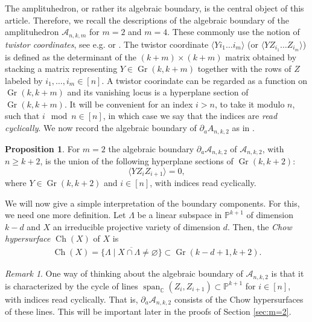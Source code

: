 \documentclass[12pt]{extarticle}
\theoremstyle{definition}
\theoremstyle{theorem}
\newtheorem{proposition}[definition]{Proposition}
\theoremstyle{remark}
\newtheorem{remark}[definition]{Remark}
\numberwithin{equation}{section}
\newcommand{\C}{\mathbb{C}}
\newcommand{\PP}{\mathbb{P}}
\DeclareMathOperator{\gr}{Gr}
\newcommand{\aA}{\mathcal{A}}
\newcommand{\CH}{\operatorname{Ch}}
\begin{document}
The amplituhedron, or rather its algebraic boundary, is the central object of this article.
Therefore, we recall the descriptions of the algebraic boundary of the amplituhedron $\aA_{n,k,m}$ for $m=2$ and $m=4$.
These commonly use the notion of \emph{twistor coordinates}, see e.g. \cite{hodges2013eliminating} or \cite[Definition 4.5]{williams2023positive}. The twistor coordinate $\langle Yi_1\dots i_m\rangle$ (or $\langle YZ_{i_1}\dots Z_{i_m}\rangle$) is defined as the determinant of the $(k+m)\times (k+m)$ matrix obtained by stacking a matrix representing $Y\in\gr(k,k+m)$ together with the rows of $Z$ labeled by $i_1,\ldots, i_m\in [n]$.
A twistor coorindate can be regarded as a function on $\gr(k,k+m)$ and its vanishing locus is a hyperplane section of $\gr(k,k+m)$. 
It will be convenient for an index $i>n$, to take it modulo $n$, such that $i \mod n \in [n]$, in which case we say that the indices are \emph{read cyclically}.
We now record the algebraic boundary of $\partial_a A_{n,k,2}$ as in \cite[Proposition 3.1]{amplituhedron_adjoint}.


\begin{proposition}\label{prop:m=2alg_bd}
    For $m=2$ the algebraic boundary $\partial_a \aA_{n,k,2}$ of $\aA_{n,k,2}$, with $n \geq k+2$,
    is the union of the following hyperplane sections of $\gr(k,k+2)$:
    \[
    \langle YZ_i Z_{i+1} \rangle = 0,
    \]
    where $Y\in \gr(k,k+2)$ and $i\in [n]$, with indices read cyclically.
\end{proposition}

We will now give a simple interpretation of the boundary components. For this, we need one more definition. Let $\Lambda$ be a linear subspace in $\PP^{k+1}$ of dimension $k-d$ and $X$ an irreducible projective variety of dimension $d$. Then, the \emph{Chow hypersurface} $\CH(X)$ of $X$ is 
    \begin{align*}
        \CH(X) = \overline{\{\Lambda\mid X\cap \Lambda\neq \varnothing\}}\subset\gr(k-d+1,k+2).
    \end{align*}

\begin{remark}
    One way of thinking about the algebraic boundary of $\aA_{n,k,2}$ is that it is characterized by the cycle of lines $\operatorname{span}_{\C}(Z_i,Z_{i+1})\subset \PP^{k+1}$ for $i\in [n]$, with indices read cyclically.
    That is, $\partial_a \aA_{n,k,2}$ consists of the Chow hypersurfaces of these lines. This will be important later in the proofs of Section \ref{sec:m=2}.
\end{remark}
\end{document}
